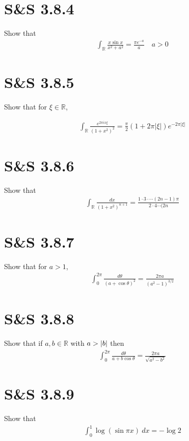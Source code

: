 \documentclass{scrreport}
\DeclarePairedDelimiter\abs{\lvert}{\rvert}%
\begin{document}
\section{S&S 3.8.4}
Show that
\begin{align}
    \int_{\mathbb R} \frac{x\sin x}{x^2 + a^2} = \frac{\pi e^{-a}}{a} \quad a > 0
\end{align}

\section{S&S 3.8.5}
Show that for $\xi \in \mathbb{R}$,

\begin{align}
    \int_{\mathbb R} \frac{e^{2\pi i x \xi}}{(1+x^2)^2} = \frac \pi 2 ( 1 + 2\pi |\xi|)e^{-2\pi |\xi|}
\end{align}

\section{S&S 3.8.6}
Show that
\begin{align}
    \int_{\mathbb R} \frac{dx}{(1+x^2)^{n+1}} = \frac{1\cdot 3\cdot \cdots (2n-1)\pi }{2\cdot 4\cdots (2n}
\end{align}

\section{S&S 3.8.7}
Show that for $a > 1$,
\begin{align}
    \int_0^{2\pi} \frac{d\theta}{(a+\cos \theta)^2} = 
    \frac{2\pi a}{(a^2-1)^{3/2}}
\end{align}

\section{S&S 3.8.8}
Show that if $a, b\in \mathbb{R}$ with $a > \abs{b}$ then
\begin{align}
    \int_0^{2\pi} \frac{d\theta}{a + b\cos \theta} =
    \frac{2\pi a}{\sqrt{a^2-b^2}}
\end{align}

\section{S&S 3.8.9}
Show that 
\begin{align}
    \int_0^1 \log(\sin \pi x) ~dx = -\log 2
\end{align}
\end{document}
